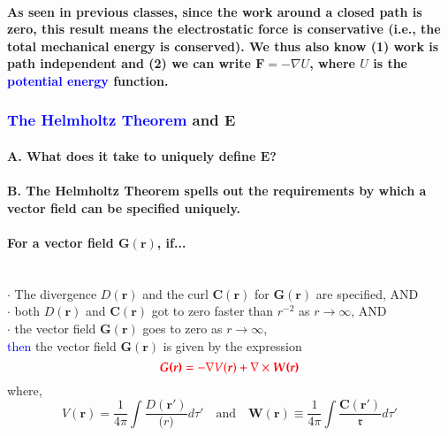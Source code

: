 \documentclass{article}
\begin{document}
\paragraph{As seen in previous classes, since the work around a closed path is zero, this result means the electrostatic force is conservative (i.e., the total mechanical energy is conserved). We thus also know (1) work is path independent and (2) we can write $\boldsymbol{F}=-\nabla U$, where $U$ is the \textcolor{blue}{potential energy} function.}
\subsubsection{\textcolor{blue}{The Helmholtz Theorem} and $\boldsymbol{E}$}
\paragraph{A. What does it take to uniquely define $\boldsymbol{E}$?}
\paragraph{B. The Helmholtz Theorem spells out the requirements by which a vector field can be specified uniquely.}
\paragraph{For a vector field $\boldsymbol{G(r)}$, if...}
\quad\\
$\cdot$ The divergence $D(\boldsymbol{r})$ and the curl $\boldsymbol{C(r)}$ for $\boldsymbol{G(r)}$ are specified, AND\\
$\cdot$ both $D(\boldsymbol{r})$ and $\boldsymbol{C(r)}$ got to zero faster than $r^{-2}$ as $r\rightarrow \infty$, AND\\
$\cdot$ the vector field $\boldsymbol{G(r)}$ goes to zero as $r\rightarrow \infty$,\\
\textcolor{blue}{then} the vector field $\boldsymbol{G(r)}$ is given by the expression
\begin{equation*}
    \textcolor{red}{\boldsymbol{G(r)}=-\nabla V(\boldsymbol{r}) +\nabla \times \boldsymbol{W(r)}}
\end{equation*}
\indent where,
\begin{equation*}
    V(\boldsymbol{r})=\frac{1}{4\pi}\int\frac{D(\boldsymbol{r'})}{\mathfrak(r)}d\tau' \quad \text{and} \quad \boldsymbol{W(r)}\equiv \frac{1}{4\pi}\int\frac{\boldsymbol{C(r')}}{\mathfrak{r}}d\tau'
\end{equation*}
\end{document}
